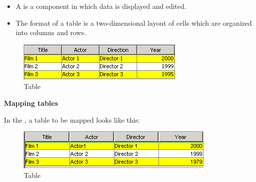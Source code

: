 \begin{itemize}
\item A  is a component in which data is displayed and edited. 
\item The format of a table is a two-dimensional layout of cells which are organized into columns and rows.
\end{itemize}


\begin{figure}
\begin{center}
\includegraphics{PS/Table}
\caption{Table}
\label{table}
\end{center}
\end{figure}

\textbf{Mapping tables}

In the \gdomm{}, a table to be mapped looks like this:

\begin{figure}
\begin{center}
\includegraphics{PS/Maptable}
\caption{Table}
\label{maptable}
\end{center}
\end{figure}
